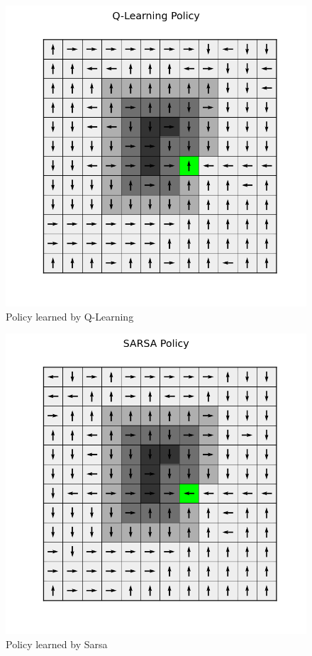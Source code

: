\documentclass[a4paper]{article}
\begin{document}
\begin{figure}[htbp!]
\center
\includegraphics[scale=0.75]{C/Q-Learning-policy.png}
\caption{Policy learned by Q-Learning}
\end{figure}

\begin{figure}[htbp!]
\center
\includegraphics[scale=0.75]{C/SARSA-policy.png}
\caption{Policy learned by Sarsa}
\end{figure}
\end{document}

